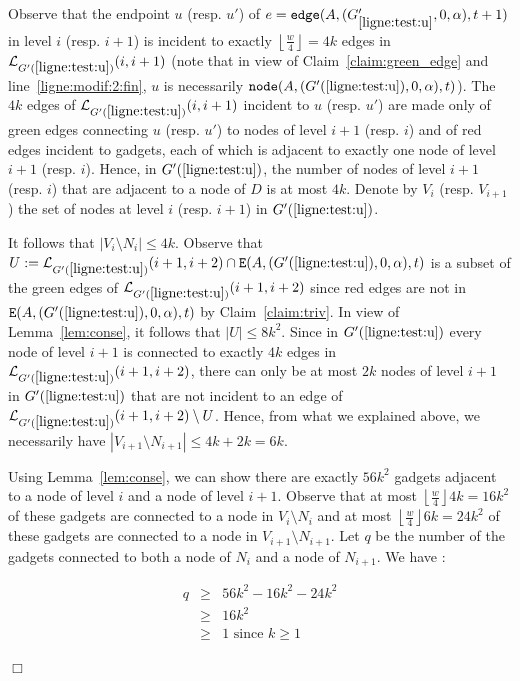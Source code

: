 \documentclass[11pt]{article}
\newcommand{\qed}{\hfill $\Box$ \bigbreak}
\newenvironment{proof}{\noindent {\bf Proof.}}{\qed}
\begin{document}
{\begin{proof}
Observe that the endpoint $u$ (resp. $u'$) of $e={\tt edge}(A,(G'_{\ref{ligne:test:u}},0,\alpha),t+1)$ in level $i$ (resp. $i+1$) is incident to exactly $\left\lfloor\frac{w}{4}\right\rfloor=4k$ edges in $\mathcal{L}_{G'(\ref{ligne:test:u})}(i,i+1)$ (note that in view of Claim~\ref{claim:green_edge} and line~\ref{ligne:modif:2:fin}, $u$ is necessarily ${\tt node}(A,(G'(\ref{ligne:test:u}),0,\alpha),t)$). The $4k$ edges of $\mathcal{L}_{G'(\ref{ligne:test:u})}(i,i+1)$ incident to $u$ (resp. $u'$) are made only of green edges connecting $u$ (resp. $u'$) to nodes of level $i+1$ (resp. $i$) and of red edges incident to gadgets, each of which is adjacent to exactly one node of level $i+1$ (resp. $i$). Hence, in $G'(\ref{ligne:test:u})$, the number of nodes of level $i+1$ (resp. $i$) that are adjacent to a node of $D$ is at most $4k$. Denote by $V_i$ (resp. $V_{i+1}$) the set of nodes at level $i$ (resp. $i+1$) in $G'(\ref{ligne:test:u})$.



It follows that $|V_i\setminus N_i|\leq 4k$. 
Observe that $U:=\mathcal{L}_{G'(\ref{ligne:test:u})}(i+1,i+2)\cap {\tt E}(A,(G'(\ref{ligne:test:u}),0,\alpha),t)$ is a subset of the green edges of $\mathcal{L}_{G'(\ref{ligne:test:u})}(i+1,i+2)$ since red edges are not in ${\tt E}(A,(G'(\ref{ligne:test:u}),0,\alpha),t)$ by Claim~\ref{claim:triv}. In view of Lemma~\ref{lem:conse}, it follows that $|U|\leq 8k^2$. Since in $G'(\ref{ligne:test:u})$ every node of level $i+1$ is connected to exactly $4k$ edges in  $\mathcal{L}_{G'(\ref{ligne:test:u})}(i+1,i+2)$, there can only be at most $2k$ nodes of level $i+1$ in $G'(\ref{ligne:test:u})$ that are not incident to an edge of $\mathcal{L}_{G'(\ref{ligne:test:u})}(i+1,i+2)\setminus U$. Hence, from what we explained above, we necessarily have $|V_{i+1}\setminus N_{i+1}|\leq 4k +2k = 6k$.

Using Lemma~\ref{lem:conse}, we can show there are exactly $56k^2$ gadgets adjacent to a node of level $i$ and a node of level $i+1$. Observe that at most $\left\lfloor\frac{w}{4}\right\rfloor 4k =16k^2$ of these gadgets are connected to a node in $V_i\setminus N_i$ and at most $\left\lfloor\frac{w}{4}\right\rfloor 6k = 24k^2$ of these gadgets are connected to a node in $V_{i+1}\setminus N_{i+1}$. 
Let $q$ be the number of the gadgets connected to both a node of $N_{i}$ and a node of $N_{i+1}$.
We have :

\begin{eqnarray*}
  q & \geq & 56k^2 - 16k^2 - 24k^2\\
  & \geq & 16k^2\\
  & \geq & 1 \mbox{ since $k\geq 1$}
\end{eqnarray*}


\end{proof}}
\end{document}
